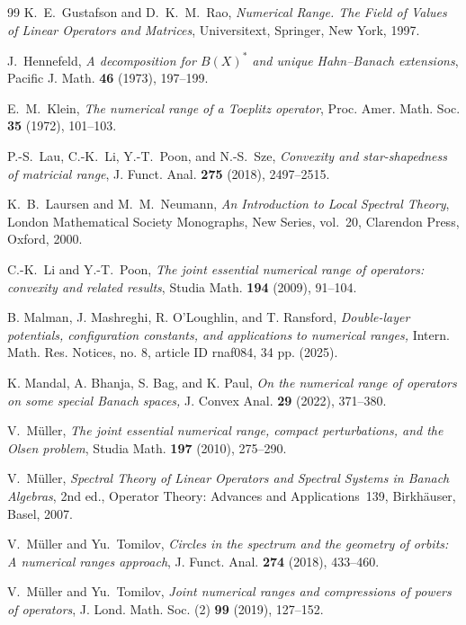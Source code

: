 \documentclass[11pt]{amsart}
\numberwithin{equation}{section}
\theoremstyle{definition}
\theoremstyle{remark}
\begin{document}
\begin{thebibliography}{99}
K.~E.~Gustafson and D.~K.~M.~Rao,
\emph{Numerical Range. The Field of Values of Linear Operators and Matrices},
Universitext, Springer, New York, 1997.


J.~Hennefeld,
\emph{A decomposition for $B(X)^*$ and unique Hahn--Banach extensions},
Pacific J. Math. \textbf{46} (1973), 197--199.


E.~M.~Klein,
\emph{The numerical range of a Toeplitz operator},
Proc. Amer. Math. Soc. \textbf{35} (1972), 101--103.



P.-S.~Lau, C.-K.~Li, Y.-T.~Poon, and N.-S.~Sze,
\emph{Convexity and star-shapedness of matricial range},
J. Funct. Anal. \textbf{275} (2018),  2497--2515.


K.~B.~Laursen and M.~M.~Neumann,
\emph{An Introduction to Local Spectral Theory},
London Mathematical Society Monographs, New Series, vol.~20,
Clarendon Press, Oxford, 2000.

C.-K.~Li and Y.-T.~Poon,
\emph{The joint essential numerical range of operators: convexity and related results},
Studia Math. \textbf{194} (2009), 91--104.

 B. Malman, J. Mashreghi, R. O’Loughlin, and T. Ransford, \emph{Double-layer potentials, configuration constants, and applications to numerical ranges,} Intern. Math. Res. Notices, no. 8, article ID rnaf084, 34 pp. (2025).

 K. Mandal, A. Bhanja, S. Bag, and K. Paul, \emph{On the numerical range of operators on some special Banach spaces,}
  J. Convex Anal. \textbf{29} (2022),  371--380.

V.~M\"uller,
\emph{The joint essential numerical range, compact perturbations, and the Olsen problem},
Studia Math. \textbf{197} (2010), 275--290.

V.~M\"uller,
\emph{Spectral Theory of Linear Operators and Spectral Systems in Banach Algebras},
2nd ed., Operator Theory: Advances and Applications~139, Birkh\"auser, Basel, 2007.

V.~M\"uller and Yu.~Tomilov,
\emph{Circles in the spectrum and the geometry of orbits: A numerical ranges approach},
J. Funct. Anal. \textbf{274} (2018),  433--460.


V.~M\"uller and Yu.~Tomilov,
\emph{Joint numerical ranges and compressions of powers of operators},
J. Lond. Math. Soc. (2) \textbf{99} (2019),  127--152.


\end{thebibliography}
\end{document}
